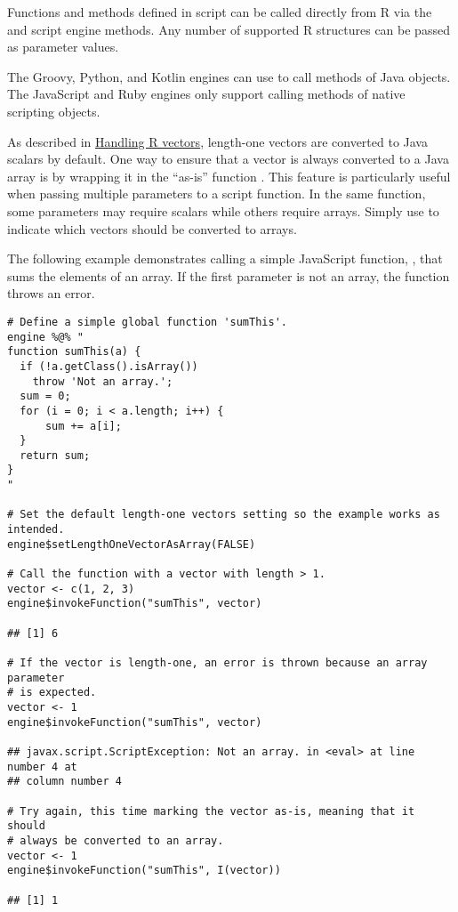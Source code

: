 Functions and methods defined in script can be called directly from R via the  and  script engine methods. Any number of supported R structures can be passed as parameter values.

 The Groovy, Python, and Kotlin engines can use  to call methods of Java objects. The JavaScript and Ruby engines only support calling methods of native scripting objects.

As described in \hyperlink{handlingrvectors}{Handling R vectors}, length-one vectors are converted to Java scalars by default. One way to ensure that a vector is always converted to a Java array is by wrapping it in the ``as-is'' function . This feature is particularly useful when passing multiple parameters to a script function. In the same function, some parameters may require scalars while others require arrays. Simply use  to indicate which vectors should be converted to arrays.

The following example demonstrates calling a simple JavaScript function, , that sums the elements of an array. If the first parameter is not an array, the function throws an error.

\begin{verbatim}
# Define a simple global function 'sumThis'.
engine %@% "
function sumThis(a) {
  if (!a.getClass().isArray())
    throw 'Not an array.';
  sum = 0;
  for (i = 0; i < a.length; i++) {
      sum += a[i];
  }
  return sum;
}
"

# Set the default length-one vectors setting so the example works as intended.
engine$setLengthOneVectorAsArray(FALSE)

# Call the function with a vector with length > 1.
vector <- c(1, 2, 3)
engine$invokeFunction("sumThis", vector)

## [1] 6

# If the vector is length-one, an error is thrown because an array parameter
# is expected.
vector <- 1
engine$invokeFunction("sumThis", vector)

## javax.script.ScriptException: Not an array. in <eval> at line number 4 at
## column number 4

# Try again, this time marking the vector as-is, meaning that it should
# always be converted to an array.
vector <- 1
engine$invokeFunction("sumThis", I(vector))

## [1] 1
\end{verbatim}

